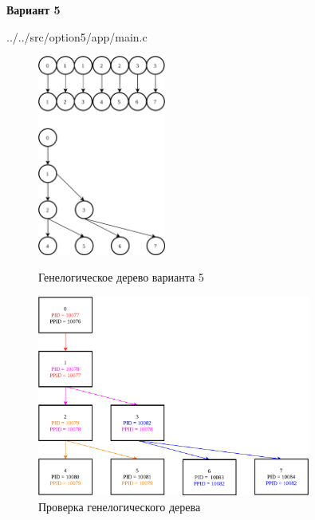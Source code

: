 \newpage

\textbf{Вариант 5}


{../../src/option5/app/main.c}

\begin{figure}[!htp]
    \begin{minipage}{0.49\textwidth}
        \centering
        \includegraphics[height=6.6cm]
        {../_INCLUDES/option5/option5.png}
        \caption{Генелогическое дерево варианта 5}
    \end{minipage}\hfill
    \begin{minipage}{0.49\textwidth}
        \centering
        \includegraphics[height=6.6cm]
        {../_INCLUDES/option5/option5-test.png}
        \caption{Проверка генелогического дерева}
    \end{minipage}
\end{figure}

\newpage

